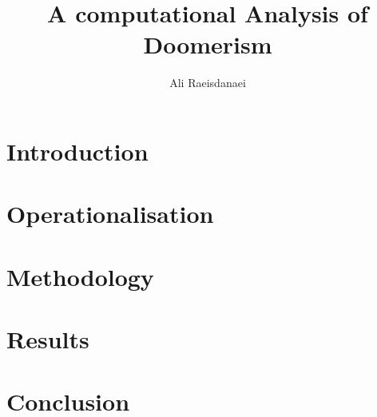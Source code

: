 \documentclass{article}
\begin{document}

\title{A computational Analysis of Doomerism}
\author{Ali Raeisdanaei}
\maketitle

\begin{multicols}{2}
\section{Introduction}


\section{Operationalisation}


\section{Methodology}


\section{Results}


\section{Conclusion}


\end{multicols}

\printbibliography
\end{document}
